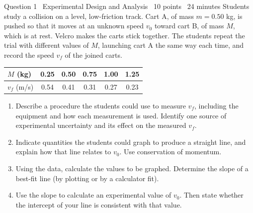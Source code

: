 \documentclass[11pt]{article}
\begin{document}
\begin{frq}{Question 1 \textperiodcentered\ Experimental Design and Analysis \textperiodcentered\ 10 points \textperiodcentered\ 24 minutes}
Students study a collision on a level, low-friction track. Cart A, of mass $m = 0.50$ kg, is pushed so that it moves at an unknown speed $v_0$ toward cart B, of mass $M$, which is at rest. Velcro makes the carts stick together. The students repeat the trial with different values of $M$, launching cart A the same way each time, and record the speed $v_f$ of the joined carts.

\medskip
\begin{tabular}{@{}lccccc@{}}\toprule
$M$ (kg) & 0.25 & 0.50 & 0.75 & 1.00 & 1.25 \\ \midrule
$v_f$ (m/s) & 0.54 & 0.41 & 0.31 & 0.27 & 0.23 \\ \bottomrule
\end{tabular}

\begin{enumerate}[label=(\alph*),leftmargin=2em,itemsep=4pt]
\item Describe a procedure the students could use to measure $v_f$, including the equipment and how each measurement is used. Identify one source of experimental uncertainty and its effect on the measured $v_f$. 
\item Indicate quantities the students could graph to produce a straight line, and explain how that line relates to $v_0$. Use conservation of momentum. 
\item Using the data, calculate the values to be graphed. Determine the slope of a best-fit line (by plotting or by a calculator fit). 
\item Use the slope to calculate an experimental value of $v_0$. Then state whether the intercept of your line is consistent with that value. 
\end{enumerate}
\end{frq}

\makekey
\end{document}
